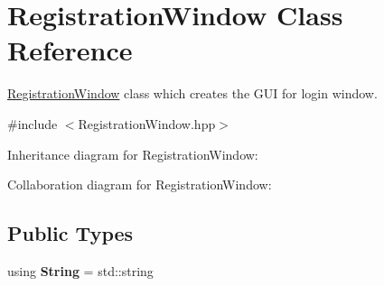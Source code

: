 \hypertarget{classRegistrationWindow}{}\section{Registration\+Window Class Reference}
\label{classRegistrationWindow}


\hyperlink{classRegistrationWindow}{Registration\+Window} class which creates the G\+UI for login window.  




{\ttfamily \#include $<$Registration\+Window.\+hpp$>$}



Inheritance diagram for Registration\+Window\+:


Collaboration diagram for Registration\+Window\+:
\subsection*{Public Types}
\begin{DoxyCompactItemize}
\item 
using {\bfseries String} = std\+::string\hypertarget{classRegistrationWindow_af737e72502243796bee87789c8b5b9ea}{}\label{classRegistrationWindow_af737e72502243796bee87789c8b5b9ea}

\end{DoxyCompactItemize}
